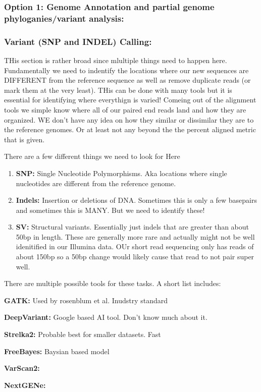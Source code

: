 \documentclass{article}
\begin{document}
    \subsubsection{\textbf{Option 1: Genome Annotation and partial genome phyloganies/variant analysis:}}

    \subsubsection{\textbf{Variant (SNP and INDEL) Calling:}} THis section is rather broad since mlultiple things need to happen here.  Fundamentally we need to indentify the locations where our new sequences are DIFFERENT from the reference sequence as well as remove duplicate reads (or mark them at the very least).   THis can be done with many tools but it is essential for identifying where everythign is varied!   Comeing out of the alignment tools we simple know where all of our paired end reads land and how they are organized.   WE don't have any idea on how they similar or dissimilar they are to the reference genomes. Or at least not any beyond the the percent aligned metric that is given.    

    There are a few different things we need to look for Here
    \begin{enumerate}
        \item \textbf{SNP:} Single Nucleotide Polymorphisms.   Aka locations where single nucleotides are different from the reference genome.
        \item \textbf{Indels:} Insertion or deletions of DNA.   Sometimes this is only a few basepairs and sometimes this is MANY.   But we need to identify these!
        \item \textbf{SV:} Structural variants.   Essentially just indels that are greater than about 50bp in length.   These are generally more rare and actually might not be well idenitified in our Illumina data.   OUr short read sequencing only has reads of about 150bp so a 50bp change would likely cause that read to not pair super well.
    \end{enumerate}

    There are multiple possible tools for these tasks.   A short list includes:
    \begin{eunmerate}
        \item\textbf{GATK:} Used by rosenblum et al.   Inudstry standard
        \item \textbf{DeepVariant:} Google based AI tool.  Don't know much about it.
        \item \textbf{Strelka2:} Probable best for smaller datasets.   Fast
        \item \textbf{FreeBayes:} Baysian based model
        \item \textbf{VarScan2:}
        \item \textbf{NextGENe:}
    \end{eunmerate}
\end{document}
